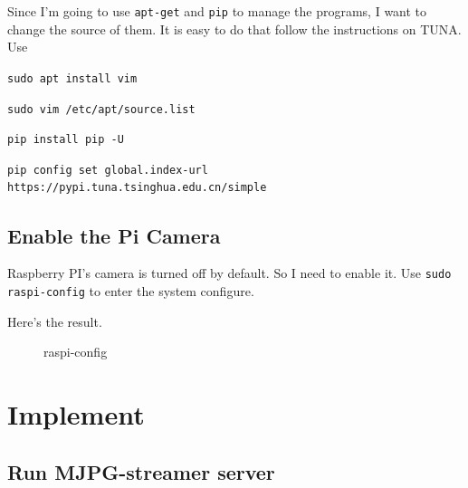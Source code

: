 \documentclass{article}
\begin{document}
Since I'm going to use \verb|apt-get| and \verb|pip| to manage the programs, I want to change the source of them. It is easy to do that follow the instructions on TUNA\cite{tuna}. Use

\verb|sudo apt install vim|

\verb|sudo vim /etc/apt/source.list|

\verb|pip install pip -U|

\verb|pip config set global.index-url https://pypi.tuna.tsinghua.edu.cn/simple|

\subsection{Enable the Pi Camera}
Raspberry PI's camera is turned off by default. So I need to enable it. Use \verb|sudo raspi-config| to enter the system configure.

Here's the result.

\begin{figure}[!h]
	\centering
	\hspace{0 pt}
	\caption{raspi-config}
	\label{fig:PicamEN}
\end{figure}

\section{Implement}

\subsection{Run MJPG-streamer server}
\end{document}
